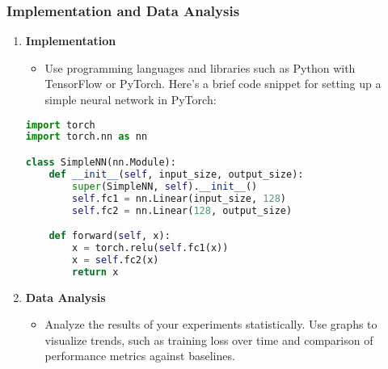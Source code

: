 \documentclass[aspectratio=169]{beamer}
\begin{document}
\begin{frame}[fragile]
    \frametitle{Implementation and Data Analysis}
    \begin{enumerate}
        \item \textbf{Implementation}
        \begin{itemize}
            \item Use programming languages and libraries such as Python with TensorFlow or PyTorch. Here’s a brief code snippet for setting up a simple neural network in PyTorch:
        \end{itemize}
        \begin{lstlisting}[language=Python]
import torch
import torch.nn as nn

class SimpleNN(nn.Module):
    def __init__(self, input_size, output_size):
        super(SimpleNN, self).__init__()
        self.fc1 = nn.Linear(input_size, 128)
        self.fc2 = nn.Linear(128, output_size)

    def forward(self, x):
        x = torch.relu(self.fc1(x))
        x = self.fc2(x)
        return x
        \end{lstlisting}
        
        \item \textbf{Data Analysis}
        \begin{itemize}
            \item Analyze the results of your experiments statistically. Use graphs to visualize trends, such as training loss over time and comparison of performance metrics against baselines.
        \end{itemize}
    \end{enumerate}
\end{frame}
\end{document}
